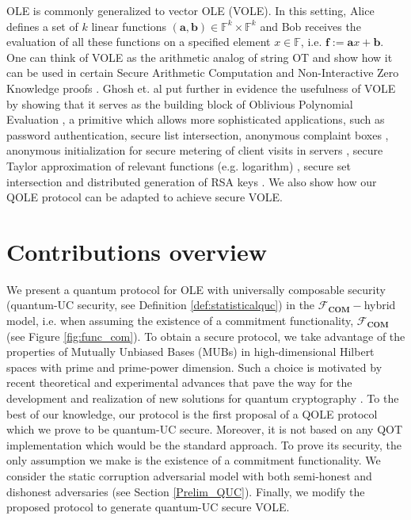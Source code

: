 OLE is commonly generalized to vector OLE (VOLE). In this setting, Alice defines a set of $k$ linear functions $(\bm{a}, \bm{b})\in\mathbb{F}^k\times\mathbb{F}^k$ and Bob receives the evaluation of all these functions on a specified element $x\in\mathbb{F}$, i.e. $\bm{f}:=\bm{a} x+ \bm{b}$. One can think of VOLE as the arithmetic analog of string OT and show how it can be used  in certain Secure Arithmetic Computation and Non-Interactive Zero Knowledge proofs \cite{BCGI18}. Ghosh et. al  put further in evidence the usefulness of VOLE by showing that it serves as the building block of Oblivious Polynomial Evaluation \cite{GNN17}, a primitive which allows more sophisticated applications, such as password authentication, secure  list intersection,  anonymous complaint boxes \cite{NP06}, anonymous initialization for secure metering of client visits in servers \cite{NP99},  secure Taylor approximation of relevant functions (e.g. logarithm) \cite{LP02}, secure set intersection \cite{H18} and distributed generation of RSA keys \cite{G99}.  We also show how our QOLE protocol can be adapted to achieve secure VOLE.

\section{Contributions overview}\label{Intro_contributions}

 We present a quantum protocol for OLE with universally composable security (quantum-UC security, see Definition \ref{def:statisticalquc}) in the $\mathcal{F}_{\textbf{COM}}-$hybrid model, i.e. when assuming the existence of a commitment functionality, $\mathcal{F}_{\textbf{COM}}$ (see Figure \ref{fig:func_com}). To obtain a secure protocol, we take advantage of the properties of Mutually Unbiased Bases (MUBs) in high-dimensional Hilbert spaces with prime and prime-power dimension. Such a choice is motivated by recent theoretical and experimental advances that pave the way for the development and realization of new solutions for quantum cryptography \cite{BPT00, CBKG02, AGS03, AKBH07, SS10, DEBZ10, Zhongetal2015, Sitetal17, Bouchardetal18, BHVBFHM18, DHMPPV21}. To the best of our knowledge, our protocol is the first proposal of a QOLE protocol which we prove to be quantum-UC secure. Moreover, it is not based on any QOT implementation which would be the standard approach. To prove its security, the only assumption we make is the existence of a commitment functionality. We consider the static corruption adversarial model with both semi-honest and dishonest adversaries (see Section \ref{Prelim_QUC}). Finally, we modify the proposed protocol  to  generate quantum-UC secure VOLE.

